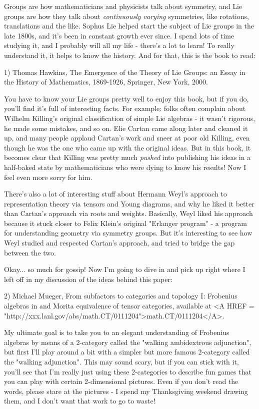 

Groups are how mathematicians and physicists talk about symmetry, and
Lie groups are how they talk about \emph{continuously varying}
symmetries, like rotations, translations and the like.  Sophus Lie
helped start the subject of Lie groups in the late 1800s, and it's been
in constant growth ever since.  I spend lots of time studying it, and I
probably will all my life - there's a lot to learn!  To really
understand it, it helps to know the history.  And for that, this is the
book to read:

1) Thomas Hawkins, The Emergence of the Theory of Lie Groups: 
an Essay in the History of Mathematics, 1869-1926, Springer,
New York, 2000.

You have to know your Lie groups pretty well to enjoy this book, but
if you do, you'll find it's full of interesting facts.  For example:
folks often complain about Wilhelm Killing's original classification 
of simple Lie algebras - it wasn't rigorous, he made some mistakes, 
and so on.  Elie Cartan came along later and cleaned it up, and 
many people applaud Cartan's work and sneer at poor old Killing,
even though he was the one who came up with the original ideas.  
But in this book, it becomes clear that Killing was pretty much 
\emph{pushed} into publishing his ideas in a half-baked state by 
mathematicians who were dying to know his results!  Now I feel
even more sorry for him.  

There's also a lot of interesting stuff about Hermann Weyl's 
approach to representation theory via tensors and Young diagrams, 
and why he liked it better than Cartan's approach via roots and 
weights.  Basically, Weyl liked his approach because it stuck closer
to Felix Klein's original "Erlanger program" - a program for 
understanding geometry via symmetry groups.  But it's interesting
to see how Weyl studied and respected Cartan's approach, and tried to
bridge the gap between the two.

Okay... so much for gossip!  Now I'm going to dive in and pick up 
right where I left off in my discussion of the ideas behind this paper:

2) Michael Mueger, From subfactors to categories and topology I:
Frobenius algebras in and Morita equivalence of tensor categories,
available at 
<A HREF = "http://xxx.lanl.gov/abs/math.CT/0111204">math.CT/0111204</A>.

My ultimate goal is to take you to an elegant understanding of
Frobenius algebras by means of a 2-category called the "walking
ambidextrous adjunction", but first I'll play around a bit with a
simpler but more famous 2-category called the "walking
adjunction".  This may sound scary, but if you can stick with it,
you'll see that I'm really just using these 2-categories to describe fun
games that you can play with certain 2-dimensional pictures.  Even if
you don't read the words, please stare at the pictures - I spend my
Thanksgiving weekend drawing them, and I don't want that work to go to
waste!

